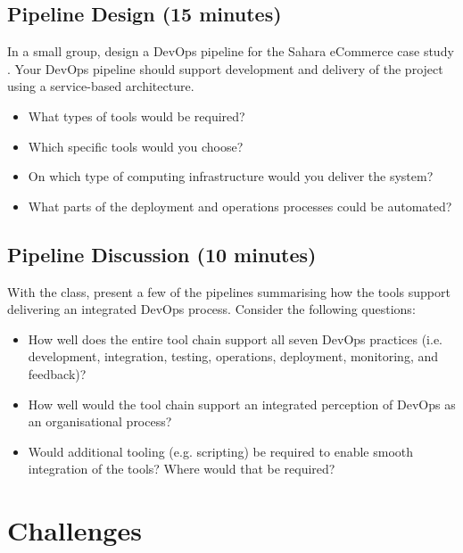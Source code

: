 \documentclass{csse4400}
\begin{document}

\subsection*{Pipeline Design (15 minutes)}
In a small group, design a DevOps pipeline for the Sahara eCommerce case study \cite{service-based-slides}.
Your DevOps pipeline should support development and delivery of the project using a service-based architecture.
\begin{itemize}
    \item What types of tools would be required?
    \item Which specific tools would you choose?
    \item On which type of computing infrastructure would you deliver the system?
    \item What parts of the deployment and operations processes could be automated?
\end{itemize}

\subsection*{Pipeline Discussion (10 minutes)}
With the class, present a few of the pipelines summarising how the tools support delivering an integrated DevOps process.
Consider the following questions:
\begin{itemize}
    \item How well does the entire tool chain support all seven DevOps practices
          (i.e. development, integration, testing, operations, deployment, monitoring, and feedback)?
    \item How well would the tool chain support an integrated perception of DevOps as an organisational process?
    \item Would additional tooling (e.g. scripting) be required to enable smooth integration of the tools?
          Where would that be required?
\end{itemize}


\section{Challenges}
\end{document}

